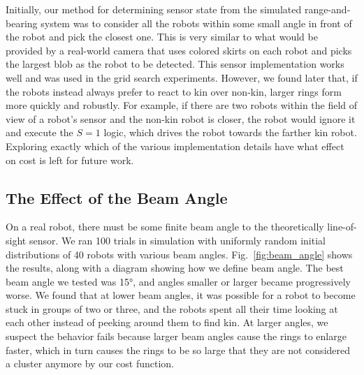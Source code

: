 \documentclass[conference]{IEEEtran}
\begin{document}
Initially, our method for determining sensor state from the simulated
range-and-bearing system was to consider all the robots within some small angle
in front of the robot and pick the closest one. This is very similar to what
would be provided by a real-world camera that uses colored skirts on each robot
and picks the largest blob as the robot to be detected. This sensor
implementation works well and was used in the grid search experiments. However,
we found later that, if the robots instead always prefer to react to kin over
non-kin, larger rings form more quickly and robustly. For example, if there are
two robots within the field of view of a robot's sensor and the non-kin robot is
closer, the robot would ignore it and execute the $S=1$ logic, which drives the
robot towards the farther kin robot. Exploring exactly which of the various
implementation details have what effect on cost is left for future work.

\subsection{The Effect of the Beam Angle} \label{sec:aperture_angle}

On a real robot, there must be some finite beam angle to the theoretically
line-of-sight sensor. We ran 100 trials in simulation with uniformly random
initial distributions of 40 robots with various beam
angles. Fig.~\ref{fig:beam_angle} shows the results, along with a diagram
showing how we define beam angle. The best beam angle we tested was \ang{15},
and angles smaller or larger became progressively worse. We found that at lower
beam angles, it was possible for a robot to become stuck in groups of two or
three, and the robots spent all their time looking at each other instead of
peeking around them to find kin. At larger angles, we suspect the behavior fails
because larger beam angles cause the rings to enlarge faster, which in turn
causes the rings to be so large that they are not considered a cluster anymore
by our cost function.
\end{document}
